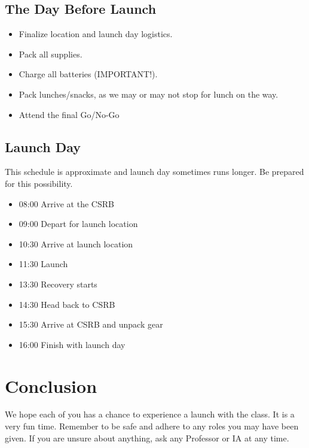 \documentclass[12pt]{article}
\begin{document}
	\subsection*{The Day Before Launch}
	\begin{itemize}
    	\item Finalize location and launch day logistics.
	    \item Pack all supplies.
	    \item Charge all batteries (IMPORTANT!).
	    \item Pack lunches/snacks, as we may or may not stop for lunch on the way.
	    \item Attend the final Go/No-Go
	\end{itemize}   
	\subsection*{Launch Day}
	This schedule is approximate and launch day sometimes runs longer. Be prepared for this possibility. 
	\begin{itemize}
	    \item 08:00 \quad Arrive at the CSRB
	    \item 09:00 \quad Depart for launch location
	    \item 10:30 \quad Arrive at launch location
	    \item 11:30 \quad Launch
	    \item 13:30 \quad Recovery starts
	    \item 14:30 \quad Head back to CSRB
	    \item 15:30 \quad Arrive at CSRB and unpack gear
	    \item 16:00 \quad Finish with launch day
	\end{itemize}
	
	\section*{Conclusion}
	We hope each of you has a chance to experience a launch with the class. It is a very fun time. Remember to be safe and adhere to any roles you may have been given. If you are unsure about anything, ask any Professor or IA at any time.
\end{document}
